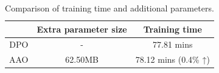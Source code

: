 \begin{table}[]
\centering
\footnotesize
\begin{tabular}{ccc}
\hline
    & Extra parameter size & Training time \\ \hline
DPO & -                    &       77.81 mins        \\
AAO &        62.50MB              &   78.12 mins (0.4\% ↑)            \\ \hline
\end{tabular}
\caption{Comparison of training time and additional parameters.}
\label{tab:consumption}
\vspace{-1em}
\end{table}